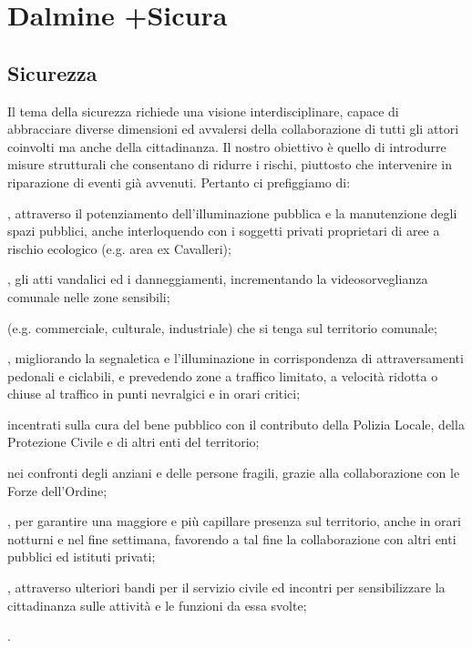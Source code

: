 \chapter{Dalmine +Sicura}
\section{Sicurezza}
Il tema della sicurezza richiede una visione interdisciplinare, capace di abbracciare diverse dimensioni ed avvalersi della collaborazione di tutti gli attori coinvolti ma anche della cittadinanza. Il nostro obiettivo è quello di introdurre misure strutturali che consentano di ridurre i rischi, piuttosto che intervenire in riparazione di eventi già avvenuti. Pertanto ci prefiggiamo di:

, attraverso il potenziamento dell'illuminazione pubblica e la manutenzione degli spazi pubblici, anche interloquendo con i soggetti privati proprietari di aree a rischio ecologico (e.g. area ex Cavalleri);

, gli atti vandalici ed i danneggiamenti, incrementando la videosorveglianza comunale nelle zone sensibili; 

 (e.g. commerciale, culturale, industriale) che si tenga sul territorio comunale;

, migliorando la segnaletica e l'illuminazione in corrispondenza di attraversamenti pedonali e ciclabili, e prevedendo zone a traffico limitato, a velocità ridotta o chiuse al traffico in punti nevralgici e in orari critici; 

 incentrati sulla cura del bene pubblico con il contributo della Polizia Locale, della Protezione Civile e di altri enti del territorio;

 nei confronti degli anziani e delle persone fragili, grazie alla collaborazione con le Forze dell'Ordine;

, per garantire una maggiore e più capillare presenza sul territorio, anche in orari notturni e nel fine settimana, favorendo a tal fine la collaborazione con altri enti pubblici ed istituti privati;

, attraverso ulteriori bandi per il servizio civile ed incontri per sensibilizzare la cittadinanza sulle attività e le funzioni da essa svolte;

. 
